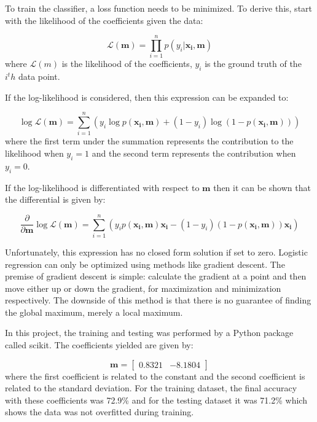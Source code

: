                 To train the classifier, a loss function needs to be minimized. To derive this, start with the likelihood of the coefficients given the data:

                \begin{equation}
                    \mathcal{L}(\mathbf{m}) = \prod_{i=1}^n p(y_i|\mathbf{x_i}, \mathbf{m})
                \end{equation}
                where $\mathcal{L}(m)$ is the likelihood of the coefficients, $y_i$ is the ground truth of the $i^th$ data point.

                If the log-likelihood is considered, then this expression can be expanded to:

                \begin{equation}
                    \log{\mathcal{L}(\mathbf{m})} = \sum_{i=1}^n (y_i\log{p(\mathbf{x_i}, \mathbf{m})} + (1-y_i)\log{(1 - p(\mathbf{x_i}, \mathbf{m}))})
                \end{equation}
                where the first term under the summation represents the contribution to the likelihood when $y_i = 1$ and the second term represents the contribution when $y_i = 0$.

                If the log-likelihood is differentiated with respect to $\mathbf{m}$ then it can be shown that the differential is given by:

                \begin{equation}
                    \frac{\partial}{\partial \mathbf{m}}\log{\mathcal{L}(\mathbf{m})} = \sum_{i=1}^n (y_ip(\mathbf{x_i}, \mathbf{m})\mathbf{x_i} - (1-y_i)(1 -p(\mathbf{x_i},\mathbf{m}))\mathbf{x_i})
                \end{equation}

                Unfortunately, this expression has no closed form solution if set to zero. Logistic regression can only be optimized using methods like gradient descent. The premise of gradient descent is simple: calculate the gradient at a point and then move either up or down the gradient, for maximization and minimization respectively. The downside of this method is that there is no guarantee of finding the global maximum, merely a local maximum. 

                In this project, the training and testing was performed by a Python package called scikit. The coefficients yielded are given by:

                \begin{equation}
                    \mathbf{m} = \begin{bmatrix} 0.8321 & -8.1804 \end{bmatrix}
                \end{equation}
                where the first coefficient is related to the constant and the second coefficient is related to the standard deviation. For the training dataset, the final accuracy with these coefficients was 72.9\% and for the testing dataset it was 71.2\% which shows the data was not overfitted during training.

